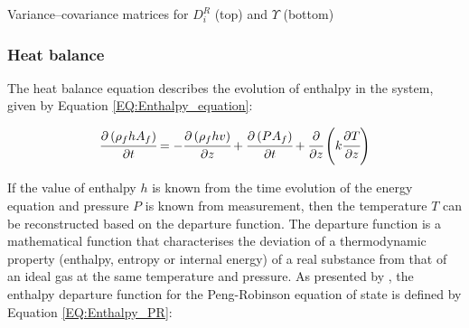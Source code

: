 \documentclass[a4paper,fleqn]{cas-dc}
\begin{document}
		\begin{table}[h!]
			\centering
			\caption{Variance–covariance matrices for $D_i^R$ (top) and $\Upsilon$ (bottom)}
			\label{tab:Uncertainty}
		\end{table}
				
		\subsubsection{Heat balance} \label{CH: heat_balance}
		
		The heat balance equation describes the evolution of enthalpy in the system, given by Equation \ref{EQ:Enthalpy_equation}:
		
		{\footnotesize
			\begin{equation} \label{EQ:Enthalpy_equation}
				\cfrac{\partial \left(\rho_f {\color{black}h} A_f\right)}{\partial t} = - \cfrac{\partial \left( \rho_f {\color{black}h}  v \right)}{\partial z} + \cfrac{\partial \left(P A_f\right)}{\partial t} + \cfrac{\partial}{\partial z} \left( k \cfrac{\partial T}{\partial z} \right)
			\end{equation}
		}
		
		If the value of enthalpy $h$ is known from the time evolution of the energy equation and pressure $P$ is known from measurement, then the temperature $T$ can be reconstructed based on the departure function. The departure function is a mathematical function that characterises the deviation of a thermodynamic property (enthalpy, entropy or internal energy) of a real substance from that of an ideal gas at the same temperature and pressure. As presented by \citet{Gmehling2019}, the enthalpy departure function for the Peng-Robinson equation of state is defined by Equation \ref{EQ:Enthalpy_PR}:
		
\end{document}
